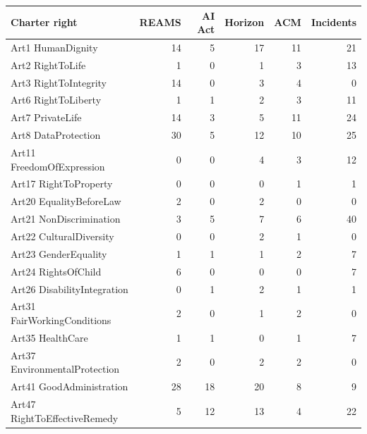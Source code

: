 \begin{tabular}{lrrrrr}
\toprule
\textbf{Charter right} & \textbf{REAMS} & \textbf{AI Act} & \textbf{Horizon} & \textbf{ACM} & \textbf{Incidents} \\
\midrule
Art1 HumanDignity & 14 & 5 & 17 & 11 & 21 \\
Art2 RightToLife & 1 & 0 & 1 & 3 & 13 \\
Art3 RightToIntegrity & 14 & 0 & 3 & 4 & 0 \\
Art6 RightToLiberty & 1 & 1 & 2 & 3 & 11 \\
Art7 PrivateLife & 14 & 3 & 5 & 11 & 24 \\
Art8 DataProtection & 30 & 5 & 12 & 10 & 25 \\
Art11 FreedomOfExpression & 0 & 0 & 4 & 3 & 12 \\
Art17 RightToProperty & 0 & 0 & 0 & 1 & 1 \\
Art20 EqualityBeforeLaw & 2 & 0 & 2 & 0 & 0 \\
Art21 NonDiscrimination & 3 & 5 & 7 & 6 & 40 \\
Art22 CulturalDiversity & 0 & 0 & 2 & 1 & 0 \\
Art23 GenderEquality & 1 & 1 & 1 & 2 & 7 \\
Art24 RightsOfChild & 6 & 0 & 0 & 0 & 7 \\
Art26 DisabilityIntegration & 0 & 1 & 2 & 1 & 1 \\
Art31 FairWorkingConditions & 2 & 0 & 1 & 2 & 0 \\
Art35 HealthCare & 1 & 1 & 0 & 1 & 7 \\
Art37 EnvironmentalProtection & 2 & 0 & 2 & 2 & 0 \\
Art41 GoodAdministration & 28 & 18 & 20 & 8 & 9 \\
Art47 RightToEffectiveRemedy & 5 & 12 & 13 & 4 & 22 \\
\bottomrule
\end{tabular}
